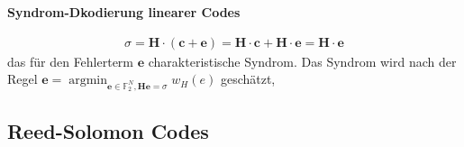 \documentclass[25pt]{sciposter}
\newenvironment{thm}[1]{\begin{mdframed}[nobreak=true,backgroundcolor=Emerald!10,innertopmargin=15pt, innerbottommargin=15pt]
		\textbf{#1 }
	}
	{ 
	\end{mdframed}
}
\begin{document}
\begin{multicols}{3}
\begin{thm}{Syndrom-Dkodierung linearer Codes}
	\begin{align*}
		\sigma = \mathbf{H\cdot (c+e)} = \mathbf{H\cdot c + H \cdot e} = \mathbf{H \cdot e} 
	\end{align*}
	das für den Fehlerterm $\mathbf{e}$ charakteristische Syndrom. Das Syndrom wird nach der Regel $\mathbf{e} = \operatorname{argmin}_{\mathbf{e}\in \mathbb{F}_2^N, \mathbf{He}=\sigma}w_H(e)$  geschätzt,
	 
\end{thm}



\subsection{Reed-Solomon Codes}




\newpage

\end{multicols}
\end{document}
